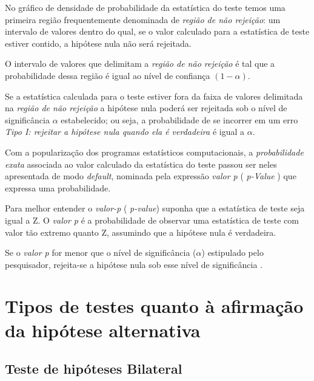 \documentclass[
]{book}
\begin{document}
\hfill\break

No gráfico de densidade de probabilidade da estatística do teste temos uma primeira região frequentemente denominada de \emph{região de não rejeição}: um intervalo de valores dentro do qual, se o valor calculado para a estatística de teste estiver contido, a hipótese nula não será rejeitada.

\hfill\break

O intervalo de valores que delimitam a \emph{região de não rejeição} é tal que a probabilidade dessa região é igual ao nível de confiança \((1-\alpha)\).

\hfill\break

Se a estatística calculada para o teste estiver fora da faixa de valores delimitada na \emph{região de não rejeição} a hipótese nula poderá ser rejeitada sob o nível de significância \(\alpha\) estabelecido; ou seja, a probabilidade de se incorrer em um erro \emph{Tipo I: rejeitar a hipótese nula quando ela é verdadeira} é igual a \(\alpha\).

\hfill\break

Com a popularização dos programas estatísticos computacionais, a \emph{probabilidade exata} associada ao valor calculado da estatística do teste passou ser neles apresentada de modo \emph{default}, nominada pela expressão \emph{valor p} ( \emph{p-Value} ) que expressa uma probabilidade.

\hfill\break

Para melhor entender o \emph{valor-p} ( \emph{p-value}) suponha que a estatística de teste seja igual a Z. O \emph{valor p} é a probabilidade de observar uma estatística de teste com valor tão extremo quanto Z, assumindo que a hipótese nula é verdadeira.

\hfill\break

Se o \emph{valor p} for menor que o nível de significância (\(\alpha\)) estipulado pelo pesquisador, rejeita-se a hipótese nula sob esse nível de significância .

\hfill\break

\hypertarget{tipos-de-testes-quanto-uxe0-afirmauxe7uxe3o-da-hipuxf3tese-alternativa}{%
\section{Tipos de testes quanto à afirmação da hipótese alternativa}\label{tipos-de-testes-quanto-uxe0-afirmauxe7uxe3o-da-hipuxf3tese-alternativa}}

\hypertarget{teste-de-hipuxf3teses-bilateral}{%
\subsection{Teste de hipóteses Bilateral}\label{teste-de-hipuxf3teses-bilateral}}
\end{document}
